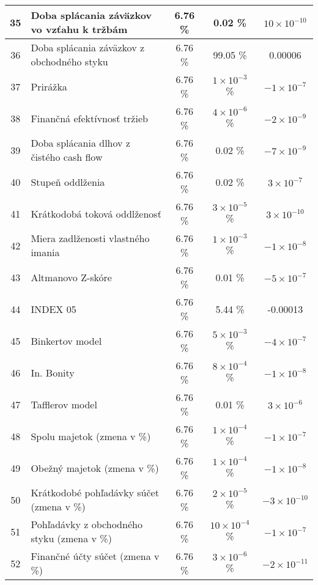 \begin{longtable}{ |c|p{5cm}|c|c|c| }
        \hline
        35 & Doba splácania záväzkov vo vzťahu k tržbám & 6.76 \% & 0.02 \% & \(10 \times 10^{-10}\) \\
        \hline
        36 & Doba splácania záväzkov z obchodného styku & 6.76 \% & 99.05 \% & 0.00006 \\
        \hline
        37 & Prirážka & 6.76 \% & \(1 \times 10^{-3}\) \% & \(-1 \times 10^{-7}\) \\
        \hline
        38 & Finančná efektívnosť tržieb & 6.76 \% & \(4 \times 10^{-6}\) \% & \(-2 \times 10^{-9}\) \\
        \hline
        39 & Doba splácania dlhov z čistého cash flow & 6.76 \% & 0.02 \% & \(-7 \times 10^{-9}\) \\
        \hline
        40 & Stupeň oddlženia & 6.76 \% & 0.02 \% & \(3 \times 10^{-7}\) \\
        \hline
        41 & Krátkodobá toková oddlženosť & 6.76 \% & \(3 \times 10^{-5}\) \% & \(3 \times 10^{-10}\) \\
        \hline
        42 & Miera zadlženosti vlastného imania & 6.76 \% & \(1 \times 10^{-3}\) \% & \(-1 \times 10^{-8}\) \\
        \hline
        43 & Altmanovo Z-skóre & 6.76 \% & 0.01 \% & \(-5 \times 10^{-7}\) \\
        \hline
        44 & INDEX 05 & 6.76 \% & 5.44 \% & -0.00013 \\
        \hline
        45 & Binkertov model & 6.76 \% & \(5 \times 10^{-3}\) \% & \(-4 \times 10^{-7}\) \\
        \hline
        46 & In. Bonity & 6.76 \% & \(8 \times 10^{-4}\) \% & \(-1 \times 10^{-8}\) \\
        \hline
        47 & Tafflerov model & 6.76 \% & 0.01 \% & \(3 \times 10^{-6}\) \\
        \hline
        48 & Spolu majetok (zmena v \%) & 6.76 \% & \(1 \times 10^{-4}\) \% & \(-1 \times 10^{-7}\) \\
        \hline
        49 & Obežný majetok (zmena v \%) & 6.76 \% & \(1 \times 10^{-4}\) \% & \(-1 \times 10^{-8}\) \\
        \hline
        50 & Krátkodobé pohľadávky súčet (zmena v \%) & 6.76 \% & \(2 \times 10^{-5}\) \% & \(-3 \times 10^{-10}\) \\
        \hline
        51 & Pohľadávky z obchodného styku (zmena v \%) & 6.76 \% & \(10 \times 10^{-4}\) \% & \(-1 \times 10^{-7}\) \\
        \hline
        52 & Finančné účty súčet (zmena v \%) & 6.76 \% & \(3 \times 10^{-6}\) \% & \(-2 \times 10^{-11}\) \\

\end{longtable}

